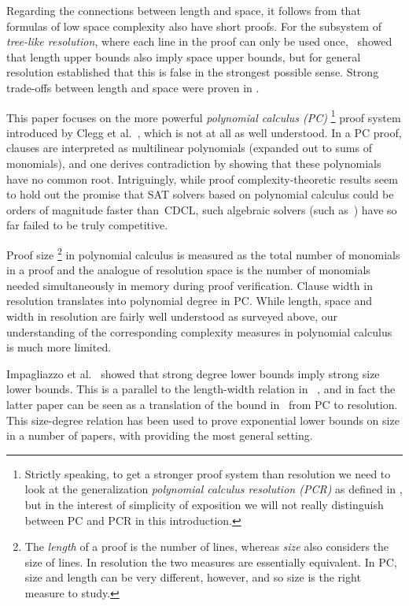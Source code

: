 \documentclass[11pt]{article}
\makeatletter
\numberwithin{equation}{section}
\theoremstyle{definition}
\theoremstyle{plain}
\theoremstyle{plain}
\theoremstyle{definition}
\newcommand{\introduceterm}[1]{{\emph{#1}}}
\newcommand{\etal}{et al.\@\xspace}
\makeatother
\begin{document}
Regarding the connections between length and space,
it follows from
\cite{AD08CombinatoricalCharacterization}
that formulas of low space complexity also have short proofs.
For the subsystem of \introduceterm{tree-like resolution},
where each line in the proof can only be used once,
\cite{ET01SpaceBounds}~showed 
%
that length upper bounds also imply space upper bounds,
but for general resolution
\cite{BN08ShortProofs} established that this is false in the
strongest possible sense. 
%
Strong trade-offs between length and space were proven in
\cite{BN11UnderstandingSpace,BBI16TimeSpace}.

This paper focuses on the more powerful
%
\introduceterm{polynomial calculus (PC)}%
\footnote{Strictly speaking, to get a stronger proof system than
  resolution we need to look at the generalization
%
%
  \introduceterm{polynomial calculus resolution (PCR)} 
  as defined in
  \cite{ABRW02SpaceComplexity},
%
%
  but in the interest of simplicity of exposition we will not really
  distinguish between PC and PCR in this introduction.
}
proof system introduced by Clegg \etal~\cite{CEI96Groebner},
which is not at all as well understood.
In a PC proof, clauses are interpreted as multilinear polynomials
(expanded out to sums of monomials),
and one derives contradiction by showing that these polynomials have
no common root. 
%
Intriguingly, while proof complexity-theoretic results seem to hold
out the promise that SAT solvers based on 
%
%
polynomial calculus could be orders of
magnitude faster than~CDCL, such algebraic solvers 
%
(such as~\cite{BD09Polybori})
have so far failed to be truly competitive.

Proof size%
\footnote{The \introduceterm{length} of a proof is the
  number of lines, whereas \introduceterm{size} also   considers 
  the size of lines. In resolution the two measures are
  essentially equivalent. In PC, %
  size and length can be
  very different, however, and so size is the right measure to study.}
in 
%
polynomial calculus   
is measured as the total number of monomials in a proof
and the analogue of resolution space is the number of monomials needed 
%
simultaneously in memory during
proof verification. Clause width in resolution
translates into polynomial degree in PC.
While length, space and width in resolution are fairly well
understood as surveyed above,
our understanding of the corresponding
complexity measures in 
%
polynomial calculus is much more limited.

Impagliazzo \etal~\cite{IPS99LowerBounds}
showed that strong degree lower bounds imply strong size lower bounds.
This is a parallel to the length-width relation 
%
in~%
\cite{BW01ShortProofs},
and in fact the latter paper can be seen as a 
translation of   the bound in~%
\cite{IPS99LowerBounds} from
PC 
%
to resolution.
This size-degree relation has been used to prove exponential lower
bounds on  size in a number of papers, with
%
\cite{AR03LowerBounds,MN15GeneralizedMethodDegree}
%
providing the most general setting.
\end{document}
